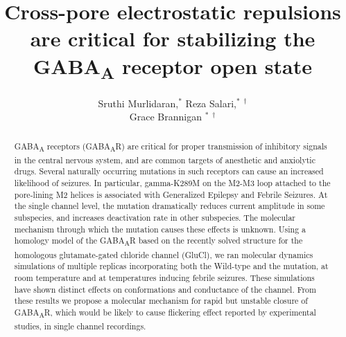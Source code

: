 \documentclass[12pt,onecolumn]{biophys}
\begin{document}
\title{Cross-pore electrostatic repulsions are critical for stabilizing the GABA\textsubscript{A} receptor open state}

\author{Sruthi Murlidaran,$^\ast$  Reza Salari,$^\ast$ $^\dagger$\\  Grace Brannigan $^\ast$ $^\dagger$\\}

\address{$^\ast$Center for Computational and Integrative Biology, Rutgers University-Camden, Camden, NJ 08102, $^\dagger$Department of Physics, Rutgers University-Camden, Camden, NJ 08102}

\newcommand{\GABAA}{GABA\textsubscript{A}R\xspace}
\newcommand{\avgr}{\bar{r}}
\newcommand{\varr}{\delta r^{2}}
\newcommand{\plgics}{pLGICs}
\newcommand{\nachr}{nAChR}

\begin{abstract}
{GABA\textsubscript{A} receptors (\GABAA) are critical for proper transmission of inhibitory signals in the central nervous system, and are common targets of anesthetic and anxiolytic drugs.  Several naturally occurring mutations in such receptors can cause an increased likelihood of seizures. In particular, gamma-K289M on the M2-M3 loop attached to the pore-lining M2 helices is associated with Generalized Epilepsy and Febrile Seizures.   At the single channel level, the mutation dramatically reduces current amplitude in some subspecies, and increases deactivation rate in other subspecies.  The molecular mechanism through which the mutation causes these effects is unknown.  Using a homology model of the \GABAA  based on the recently solved structure for the homologous glutamate-gated chloride channel (GluCl), we ran molecular dynamics simulations  of multiple replicas incorporating both the Wild-type and the mutation, at room temperature and at temperatures inducing febrile seizures. These simulations have shown distinct effects on conformations and conductance of the channel. From these results we propose a molecular mechanism for rapid but unstable closure of \GABAA, which would be likely to cause flickering effect reported by experimental studies, in single channel recordings.}%
{}
{}
\end{abstract}

\maketitle

\end{document}
